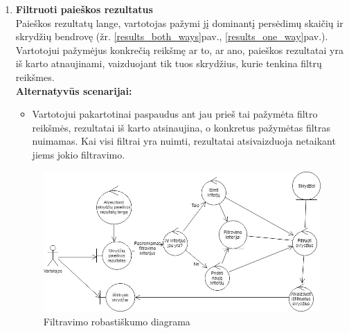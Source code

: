 \documentclass{VUMIFPSkursinis}
\begin{document}
\begin{enumerate}[label=\textbf{U\arabic*}.]
                    \item \textbf{Filtruoti paieškos rezultatus}\\
                    Paieškos rezultatų lange, vartotojas pažymi jį dominantį persėdimų skaičių ir skrydžių bendrovę (žr. \ref{results_both_ways}pav., \ref{results_one_way}pav.). Vartotojui pažymėjus konkrečią reikšmę ar to, ar ano, paieškos rezultatai yra iš karto atnaujinami, vaizduojant tik tuos skrydžius, kurie tenkina filtrų reikšmes.
                    \\\textbf{Alternatyvūs scenarijai:}
                    \begin{itemize}
                        \item Vartotojui pakartotinai paspaudus ant jau prieš tai pažymėta filtro reikšmės, rezultatai iš karto atsinaujina, o konkretus pažymėtas filtras nuimamas. Kai visi filtrai yra nuimti, rezultatai atsivaizduoja netaikant jiems jokio filtravimo.
                    \end{itemize}

                    \begin{figure}[H]
                        \centering
                        \includegraphics[scale=0.6]{img/ROBfilter}
                        \caption{Filtravimo robastiškumo diagrama}
                        \label{home_page_one_way}
                    \end{figure}


\end{enumerate}
\end{document}
